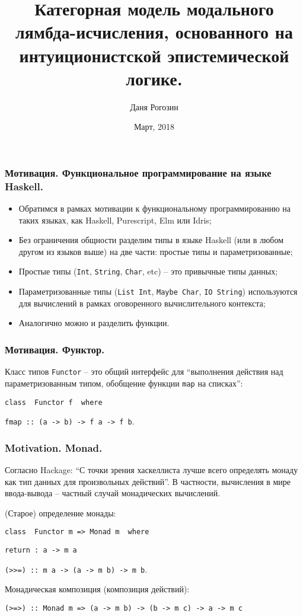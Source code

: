\documentclass[10pt,pdf,utf8,russian,aspectratio=169]{beamer}
\title{Категорная модель модального лямбда-исчисления, основанного на интуиционистской эпистемической логике.}
\institute{МГУ}
\author{Даня Рогозин}
\date{Март, 2018}
\begin{document}
\maketitle

\begin{frame}
  \frametitle{Мотивация. Функциональное программирование на языке Haskell.}
  \begin{itemize}
    \item Обратимся в рамках мотивации к функциональному программированию на таких языках, как
      Haskell, Purescript, Elm или Idris;
    \item Без ограничения общности разделим типы в языке Haskell (или в любом другом из языков выше) на две части:
    простые типы и параметризованные;
    \item Простые типы (\verb"Int", \verb"String", \verb"Char", etc) -- это привычные типы данных;
    \item Параметризованные типы (\verb"List Int", \verb"Maybe Char", \verb"IO String") используются для
    вычислений в рамках оговоренного вычислительного контекста;
    \item Аналогично можно и разделить функции.
  \end{itemize}
\end{frame}

\begin{frame}
\frametitle{Мотивация. Функтор.}
Класс типов \verb"Functor" -- это общий интерфейс для ``выполнения действия над параметризованным типом, обобщение функции \verb"map" на списках'':

\vspace{\baselineskip}

\verb"class  Functor f  where"

\quad\quad \verb"fmap :: (a -> b) -> f a -> f b".

\end{frame}

\begin{frame}
\frametitle{Motivation. Monad.}
Согласно Hackage: ``С точки зрения хаскеллиста лучше всего определять монаду как тип данных для произвольных действий''.
В частности, вычисления в мире ввода-вывода -- частный случай монадических вычислений.

\vspace{\baselineskip}

(Старое) определение монады:

\verb"class  Functor m => Monad m  where"

\quad\quad \verb"return : a -> m a"

\quad\quad \verb"(>>=) :: m a -> (a -> m b) -> m b".

\vspace{\baselineskip}

Монадическая композиция (композиция действий):

\verb"(>=>) :: Monad m => (a -> m b) -> (b -> m c) -> a -> m c"

\end{frame}
\end{document}
